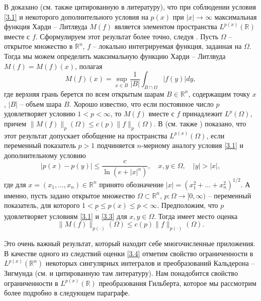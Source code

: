 В \cite{ShIIBJWDiening,ShIIBJWCruz-Uribe}  доказано (см. также цитированную в \cite{ShIIBJWDiening,ShIIBJWCruz-Uribe} литературу), что при соблюдении условия \eqref{3.1} и некоторого дополнительного условия на $p(x)$ при $|x|\to\infty$ максимальная функция Харди -- Литлвуда $M(f)$ является элементом пространства $L^{p(x)}(\mathbb{R})$ вместе с $f$. Сформулируем этот результат более точно, следуя    \cite{ShIIBJWCruz-Uribe}.
Пусть $\Omega$ -- открытое множество в $\mathbb{R}^n$, $f$ -- локально интегрируемая функция, заданная на $\Omega$. Тогда мы можем определить максимальную функцию Харди -- Литлвуда $M(f)=M(f)(x)$, полагая
\begin{equation}\label{3.2}
M(f)(x)=\sup_{x\in B}\frac{1}{|B|}\int_{B\cap\Omega}|f(y)|dy,
\end{equation}
где верхняя грань берется по всем открытым шарам $B\in \mathbb{R}^n $, содержащим точку $x$, $|B|$ -- объем шара $B$. Хорошо известно, что если постоянное число $p$  удовлетворяет условию $1<p<\infty$, то $M(f)$ вместе с $f$ принадлежит $L^p(\Omega)$, причем $\|M(f)\|_p(\Omega)\le c(p)\|f\|_p(\Omega)$. В  \cite{ShIIBJWCruz-Uribe} (см. также \cite{ShIIBJWDiening}) показано, что этот результат допускает обобщение на пространства $L^{p(x)}(\Omega)$, если переменный показатель $p>1$ подчиняется
$n$-мерному аналогу условия \eqref{3.1} и дополнительному условию
\begin{equation}\label{3.3}
|p(x)-p(y)|\le \frac{c}{\ln(e+|x|^n)}, \quad x,y\in\Omega,\quad |y|>|x|,
\end{equation}
где для $x=(x_1,\ldots,x_n)\in \mathbb{R}^n$ принято обозначение $|x|=(x_1^2+\ldots+x_n^2)^{1/2}$.
А именно, пусть задано открытое множество $\Omega\subset\mathbb{R}^n$, $p:\Omega\to [0,\infty)$ -- переменный показатель, для которого $1<\underline{p}\le p(x)\le\overline{p}<\infty$. Предположим, что   $p$ удовлетворяет условиям  \eqref{3.1} и \eqref{3.3} для $x,y\in\Omega$. Тогда имеет место оценка
\begin{equation}\label{3.4}
\|M(f)\|_{p(\cdot)}(\Omega)\le c(p)\|f\|_{p(\cdot)}(\Omega).
\end{equation}


Это очень важный результат, который находит себе многочисленные приложения. В качестве одного из следствий оценки \eqref{3.4} отметим свойство ограниченности в $L^{p(x)}(\mathbb{R}^n)$ некоторых сингулярных интегралов и преобразований Кальдерона -- Зигмунда (см.  \cite{ShIIBJWCruz-Uribe,ShIIBJWDiening} и цитированную там литературу). Нам понадобится свойство ограниченности в $L^{p(x)}(\mathbb{R})$ преобразования Гильберта, которое мы рассмотрим более подробно в следующем параграфе.


